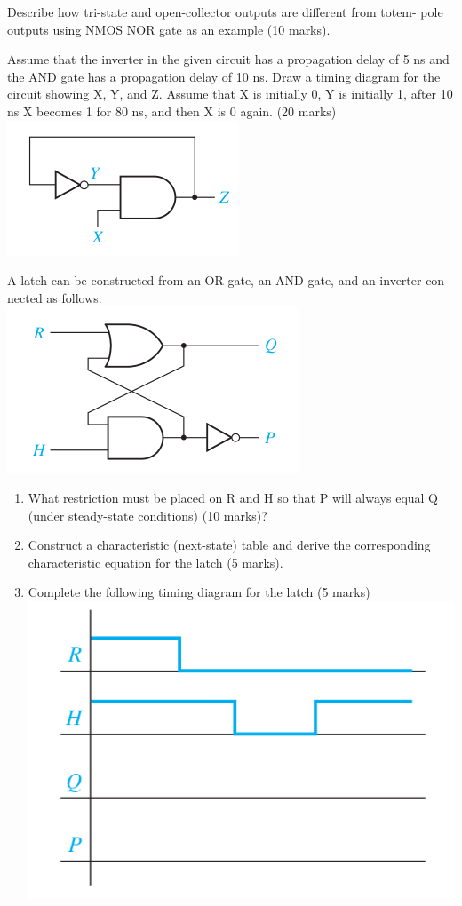 \begin{prob}
  Describe how tri-state and open-collector outputs are different from totem-
  pole outputs using NMOS NOR gate as an example (10 marks).
\end{prob}
\newpage

\begin{prob}
  Assume that the inverter in the given circuit has a propagation delay of 5 ns and the
  AND gate has a propagation delay of 10 ns. Draw a timing diagram for the circuit
  showing X, Y, and Z. Assume that X is initially 0, Y is initially 1, after 10 ns X
  becomes 1 for 80 ns, and then X is 0 again. (20 marks)\\
  \includegraphics[width=0.4\linewidth]{./fig/fig-not-AND-latch.png}
\end{prob}
\newpage

\begin{prob}
  A latch can be constructed from an OR gate, an AND gate, and an inverter con-
  nected as follows: \\
  \includegraphics[width=0.4\linewidth]{./fig/or-AND-latch.png}\\
  \begin{enumerate}
    \item  What restriction must be placed on R and H so that P will always equal Q
    (under steady-state conditions) (10 marks)?
  \item Construct a characteristic (next-state) table and derive the
    corresponding characteristic equation for the latch (5 marks).
  \item Complete the following timing diagram for the latch (5 marks)\\
    \includegraphics[width=0.4\linewidth]{./fig/timing-diagram.png}
  \end{enumerate}
\end{prob}
\newpage

